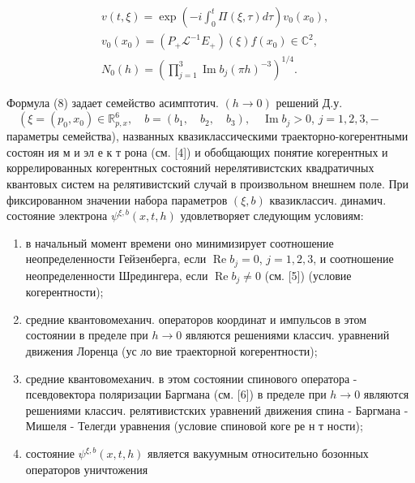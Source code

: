 \documentclass[10pt]{article}
\begin{document}
\[

\begin{aligned}

& v(t, \xi)=\exp \left(-i \int_{0}^{t} \Pi(\xi, \tau) d \tau\right) v_{0}\left(x_{0}\right), \\

& v_{0}\left(x_{0}\right)=\left(P_{+} \mathscr{L}^{-1} E_{+}\right)(\xi) f\left(x_{0}\right) \in \mathbb{C}^{2}, \\

& N_{0}(h)=\left(\prod_{j=1}^{3} \operatorname{Im} b_{j}(\pi h)^{-3}\right)^{1 / 4} .

\end{aligned}

\]



Формула (8) задает семейство асимптотич. $(h \rightarrow 0)$ решений Д.у. $\quad\left(\xi=\left(p_{0}, x_{0}\right) \in \mathbb{R}_{p, x}^{6}, \quad b=\left(b_{1}, \quad b_{2}, \quad b_{3}\right), \quad \operatorname{Im} b_{j}>0\right.$, $j=1,2,3,-$ параметры семейства), названных квазиклассическими траекторно-когерентными состоян ия м и эл е к т рона (см. [4]) и обобщающих понятие когерентных и коррелированных когерентных состояний нерелятивистских квадратичных квантовых систем на релятивистский случай в произвольном внешнем поле. При фиксированном значении набора параметров $(\xi, b)$ квазиклассич. динамич. состояние электрона $\psi^{\xi, b}(x, t, h)$ удовлетворяет следующим условиям:



\begin{enumerate}

  \item в начальный момент времени оно минимизирует соотношение неопределенности Гейзенберга, если $\operatorname{Re} b_{j}=0$, $j=1,2,3$, и соотношение неопределенности Шредингера, если $\operatorname{Re} b_{j} \neq 0$ (см. [5]) (условие когерентности);



  \item средние квантовомеханич. операторов координат и импульсов в этом состоянии в пределе при $h \rightarrow 0$ являются решениями классич. уравнений движения Лоренца (ус ло вие траекторной когерентности);



  \item средние квантовомеханич. в этом состоянии спинового оператора - псевдовектора поляризации Баргмана (см. [6]) в пределе при $h \rightarrow 0$ являются решениями классич. релятивистских уравнений движения спина - Баргмана - Мишеля - Телегди уравнения (условие спиновой коге ре н т ности);



  \item состояние $\psi^{\xi, b}(x, t, h)$ является вакуумным относительно бозонных операторов уничтожения



\end{enumerate}
\end{document}
